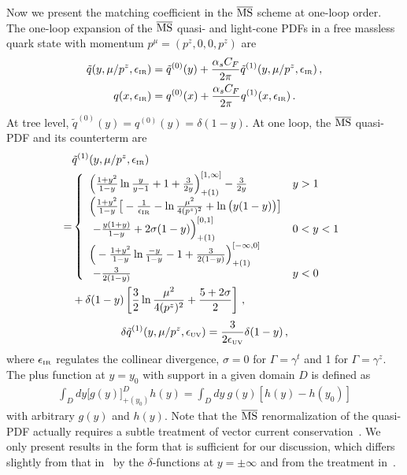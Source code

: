 \documentclass[aps,rmp,reprint,amsmath,amssymb,graphicx,longbibliography]{revtex4-1} %
\newcommand{\MS}{{\overline{\rm MS}}}
\newcommand{\nn}{\nonumber}
\begin{document}
Now we present the matching coefficient in the $\MS$ scheme at one-loop order.
The one-loop expansion of the $\MS$ quasi- and light-cone PDFs in a free massless quark state with momentum $p^\mu=(p^z,0,0,p^z)$ are
\begin{align}
	\tilde{q}(y,\mu/p^z,\epsilon_{\mbox{\tiny IR}}) &= \tilde{q}^{(0)}(y) + {\alpha_sC_F\over 2\pi}\tilde{q}^{(1)}(y,\mu/p^z,\epsilon_{\mbox{\tiny IR}})\,,\\
	q(x,\epsilon_{\mbox{\tiny IR}}) &= q^{(0)}(x) + {\alpha_sC_F\over 2\pi}q^{(1)}(x,\epsilon_{\mbox{\tiny IR}})\,.
\end{align}
At tree level, $\tilde{q}^{(0)}(y) = q^{(0)}(y) = \delta(1-y)$.
At one loop, the $\MS$ quasi-PDF and its counterterm are~\cite{Izubuchi:2018srq}
\begin{align}\label{eq:qPDFren}
	&\tilde{q}^{(1)}(y,\mu/p^z,\epsilon_{\mbox{\tiny IR}}) \nn\\
	=&\left\{
	\begin{array}{ll}
		\Big({1+y^2\over 1-y}\ln {y\over y-1} + 1 + {3\over 2y}\Big)^{[1,\infty]}_{+(1)}- {3\over 2y} & y>1\\
		\Big({1+y^2\over 1-y}\big[- {1\over \epsilon_{\mbox{\tiny IR}}} - \ln{\mu^2\over 4(p^z)^2} + \ln\big(y(1-y)\big)\big] &\\
		\  - {y(1+y)\over 1-y}+ 2\sigma (1-y)\Big)^{[0,1]}_{+(1)}  &0<y<1\\
		\Big(-{1+y^2\over 1-y}\ln {-y\over 1-y} - 1 + {3\over 2(1-y)}\Big)^{[-\infty,0]}_{+(1)}&\\
		\ - {3\over 2(1-y)} & y<0
	\end{array}\right.\nn\\
	&+ \delta(1-y)\left[{3\over2}\ln{\mu^2\over 4(p^z)^2} + {5 + 2\sigma\over2}\right]\,,
\end{align}
\begin{align}
	\delta \tilde{q}^{(1)}(y,\mu/p^z,\epsilon_{\mbox{\tiny UV}})
	= {3\over 2\epsilon_{\mbox{\tiny UV}}}
	\delta(1-y)\,,
\end{align}
where $\epsilon_{\mbox{\tiny IR}}$ regulates the collinear divergence, $\sigma=0$ for $\Gamma=\gamma^t$ and 1 for $\Gamma=\gamma^z$. The plus function at $y=y_0$ with support in a given domain $D$ is defined as
\begin{align}
	\int_D\! dy \big[ g(y)\big]_{+(y_0)}^D h(y)\! =\! \int_D\! dy\ g(y) \left[ h(y)\! -\! h(y_0)\right]
\end{align}
with arbitrary $g(y)$ and $h(y)$. Note that the $\MS$ renormalization of the quasi-PDF actually requires a subtle treatment of vector current conservation~\cite{Izubuchi:2018srq}. We only present results in the form that is sufficient for our discussion, which differs slightly from that in~\cite{Izubuchi:2018srq} by the $\delta$-functions at $y=\pm\infty$ and from the treatment in~\cite{Alexandrou:2019lfo}.
\end{document}
